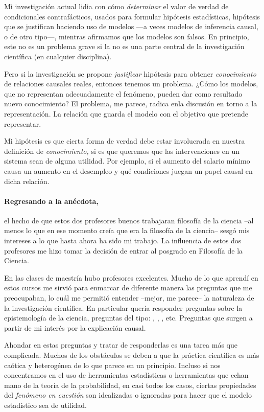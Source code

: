 Mi investigación actual lidia con cómo \emph{determinar} el valor de
verdad de condicionales contrafácticos, usados para formular
hipótesis estadísticas, hipótesis que se justifican haciendo uso de
modelos ---a veces modelos de inferencia causal, o de otro tipo---,
mientras afirmamos que los modelos son falsos. En principio, este no
es un problema grave si la  no es una parte central de la
investigación científica (en cualquier disciplina).

Pero si la investigación se propone \emph{justificar} hipótesis para
obtener \emph{conocimiento} de relaciones causales reales, entonces
tenemos un problema. ¿Cómo los modelos, que no representan
adecuadamente el fenómeno, pueden dar como resultado nuevo
conocimiento? El problema, me parece, radica enla discusión en torno
a la representación. La relación que guarda el modelo con el objetivo
que pretende representar.

Mi hipótesis es que cierta forma de verdad debe estar involucrada en
nuestra definición de \emph{conocimiento,} si es que queremos que las
intervenciones en un sistema sean de alguna utilidad. Por ejemplo, si
el aumento del salario mínimo causa un aumento en el desempleo y qué
condiciones juegan un papel causal en dicha relación.

\paragraph{Regresando a la anécdota,} el hecho de que estos dos profesores buenos trabajaran filosofía de
la ciencia --al menos lo que en ese momento creía que era la
filosofía de la ciencia-- sesgó mis intereses a lo que hasta ahora ha
sido mi trabajo. La influencia de estos dos profesores me hizo tomar
la decisión de entrar al posgrado en Filosofía de la Ciencia.

En las clases de maestría hubo profesores excelentes. Mucho de lo que
aprendí en estos cursos me sirvió para enmarcar de diferente manera
las preguntas que me preocupaban, lo cuál me permitió entender
--mejor, me parece-- la naturaleza de la investigación científica. En
particular quería responder preguntas sobre la epistemología de la
ciencia, preguntas del tipo: , , , etc. Preguntas que surgen a partir de mi interés
por la explicación causal.

Ahondar en estas preguntas y tratar de responderlas es una tarea más
que complicada. Muchos de los obstáculos se deben a que la práctica
científica es más caótica y heterogénea de lo que parece en un
principio. Incluso si nos concentramos en el uso de herramientas
estadísticas o herramientas que echan mano de la teoría de la
probabilidad, en casi todos los casos, ciertas propiedades del
\emph{fenómeno en cuestión} son idealizadas o ignoradas para hacer
que el modelo estadístico sea de utilidad.


